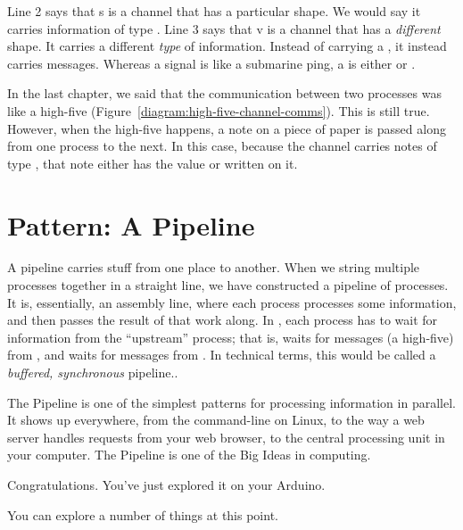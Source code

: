	Line 2 says that {\code s} is a channel that has a particular shape. We would say it carries information of type \SIGNALT. Line 3 says that {\code v} is a channel that has a {\em different} shape. It carries a different {\em type} of information. Instead of carrying a \SIGNALV, it instead carries \LEVELT messages. Whereas a signal is like a submarine ping, a \LEVELT is either \HIGH or \LOW.
	
In the last chapter, we said that the communication between two processes was like a high-five (Figure~\vref{diagram:high-five-channel-comms}). {\strong This is still true.} However, when the high-five happens, a note on a piece of paper is passed along from one process to the next. In this case, because the channel carries notes of type \LEVELT, that note either has the value \HIGH or \LOW written on it.

\section{Pattern: A Pipeline}
A pipeline carries stuff from one place to another. When we string multiple processes together in a straight line, we have constructed a {\strong pipeline} of processes. It is, essentially, an assembly line, where each process processes some information, and then passes the result of that work along. In \plumbing, each process has to wait for information from the ``upstream'' process; that is, \pl waits for messages (a high-five) from \toggle, and \toggle waits for messages from \bp. In technical terms, this would be called a {\em buffered, synchronous} pipeline.. 

The Pipeline is one of the simplest patterns for processing information in parallel. It shows up everywhere, from the command-line on Linux, to the way a web server handles requests from your web browser, to the central processing unit in your computer. The Pipeline is one of the Big Ideas in computing.

Congratulations. You've just explored it on your Arduino.

\EXPLORATIONS
You can explore a number of things at this point. 

